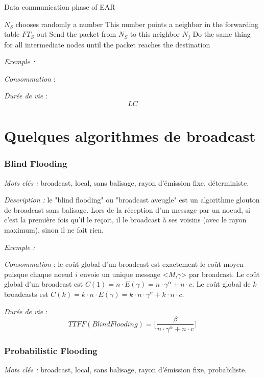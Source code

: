 \begin{algorithm}[H]
\caption{Data communication phase of EAR}
\label{algo_EAR_dcp}
\begin{algorithmic}

\STATE $N_S$ chooses randomly a number
\STATE This number points a neighbor in the forwarding table $FT_S$ out
\STATE Send the packet from $N_S$ to this neighbor $N_j$
\STATE Do the same thing for all intermediate nodes until the packet reaches the destination

\end{algorithmic}
\end{algorithm}


\emph{Exemple :} %

\emph{Consommation} : 

\emph{Durée de vie} : $$ LC $$

\section{Quelques algorithmes de broadcast}

\subsubsection{Blind Flooding\label{blind_flooding}}
\emph{Mots clés :} broadcast, local, sans balisage, rayon d'émission fixe, déterministe.

\emph{Description :} le "blind flooding" ou "broadcast aveugle" est un algorithme glouton de broadcast sans balisage. Lors de la réception d'un message par un noeud, si c'est la première fois qu'il le reçoit, il le broadcast à ses voisins (avec le rayon maximum), sinon il ne fait rien.

\emph{Exemple :} 

\emph{Consommation} :  le coût global d'un broadcast est exactement le coût moyen puisque chaque noeud $i$ envoie un unique message <$M$,$\gamma$> par broadcast.
Le coût global d'un broadcast est $C(1) = n \cdot E( \gamma )= n\cdot \gamma^\alpha +  n\cdot c $.
Le coût global de $k$ broadcasts est $C(k) = k\cdot n \cdot E( \gamma )= k\cdot n \cdot \gamma^\alpha +  k \cdot n\cdot c $.

\emph{Durée de vie} :   $$TTFF(Blind Flooding)=\lfloor \frac{\beta}{n\cdot \gamma^\alpha +  n\cdot c} \rceil$$



\subsubsection{Probabilistic Flooding\label{proba_flooding}}
\emph{Mots clés :} broadcast, local, sans balisage, rayon d'émission fixe, probabiliste.

